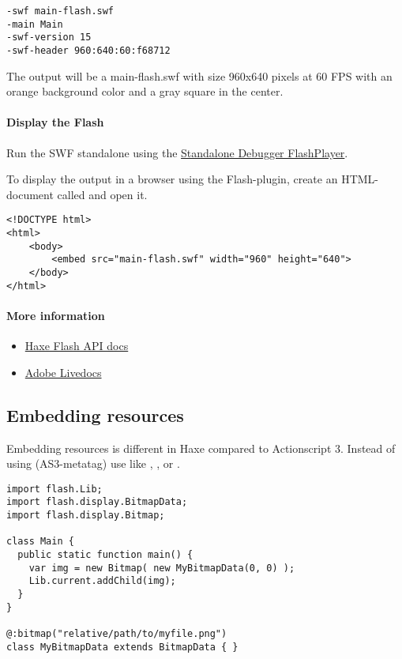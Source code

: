 \begin{lstlisting}
-swf main-flash.swf
-main Main
-swf-version 15
-swf-header 960:640:60:f68712
\end{lstlisting}

The output will be a main-flash.swf with size 960x640 pixels at 60 FPS with an orange background color and a gray square in the center.

\paragraph{Display the Flash}

Run the SWF standalone using the \href{https://www.adobe.com/support/flashplayer/downloads.html}{Standalone Debugger FlashPlayer}. 

To display the output in a browser using the Flash-plugin, create an HTML-document called  and open it.

\begin{lstlisting}
<!DOCTYPE html>
<html>
	<body>
		<embed src="main-flash.swf" width="960" height="640">
	</body>
</html>
\end{lstlisting}

\paragraph{More information}

\begin{itemize}
	\item \href{http://api.haxe.org/flash/}{Haxe Flash API docs}
	\item \href{http://help.adobe.com/en_US/FlashPlatform/reference/actionscript/3/}{Adobe Livedocs}
\end{itemize}

\subsection{Embedding resources}
\label{target-flash-resources}

Embedding resources is different in Haxe compared to Actionscript 3. Instead of using \ic{\[embed\]} (AS3-metatag) use  like , ,  or .

\begin{lstlisting}
import flash.Lib;
import flash.display.BitmapData;
import flash.display.Bitmap;

class Main {
  public static function main() {
    var img = new Bitmap( new MyBitmapData(0, 0) );
    Lib.current.addChild(img);
  }
}

@:bitmap("relative/path/to/myfile.png") 
class MyBitmapData extends BitmapData { }
\end{lstlisting}

